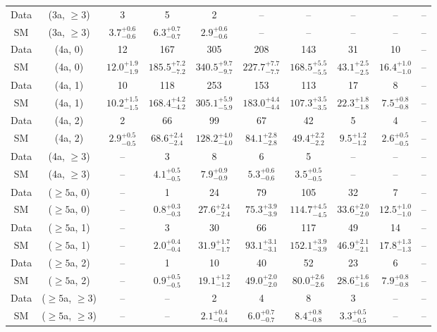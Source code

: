 \begin{table}[h!]
{\begin{tabular}{cccccccccc}
	Data & (3a, $\ge3$) & 3 & 5 & 2 & -- & -- & -- & -- & -- \\[0.5ex] 
	SM & (3a, $\ge3$) & $3.7^{+ 0.6 }_{- 0.6 }$ & $6.3^{+ 0.7 }_{- 0.7 }$ & $2.9^{+ 0.6 }_{- 0.6 }$ & -- & -- & -- & -- & -- \\[0.5ex] 
	Data & (4a, 0) & 12 & 167 & 305 & 208 & 143 & 31 & 10 & -- \\[0.5ex] 
	SM & (4a, 0) & $12.0^{+ 1.9 }_{- 1.9 }$ & $185.5^{+ 7.2 }_{- 7.2 }$ & $340.5^{+ 9.7 }_{- 9.7 }$ & $227.7^{+ 7.7 }_{- 7.7 }$ & $168.5^{+ 5.5 }_{- 5.5 }$ & $43.1^{+ 2.5 }_{- 2.5 }$ & $16.4^{+ 1.0 }_{- 1.0 }$ & -- \\[0.5ex] 
	Data & (4a, 1) & 10 & 118 & 253 & 153 & 113 & 17 & 8 & -- \\[0.5ex] 
	SM & (4a, 1) & $10.2^{+ 1.5 }_{- 1.5 }$ & $168.4^{+ 4.2 }_{- 4.2 }$ & $305.1^{+ 5.9 }_{- 5.9 }$ & $183.0^{+ 4.4 }_{- 4.4 }$ & $107.3^{+ 3.5 }_{- 3.5 }$ & $22.3^{+ 1.8 }_{- 1.8 }$ & $7.5^{+ 0.8 }_{- 0.8 }$ & -- \\[0.5ex] 
	Data & (4a, 2) & 2 & 66 & 99 & 67 & 42 & 5 & 4 & -- \\[0.5ex] 
	SM & (4a, 2) & $2.9^{+ 0.5 }_{- 0.5 }$ & $68.6^{+ 2.4 }_{- 2.4 }$ & $128.2^{+ 4.0 }_{- 4.0 }$ & $84.1^{+ 2.8 }_{- 2.8 }$ & $49.4^{+ 2.2 }_{- 2.2 }$ & $9.5^{+ 1.2 }_{- 1.2 }$ & $2.6^{+ 0.5 }_{- 0.5 }$ & -- \\[0.5ex] 
	Data & (4a, $\ge3$) & -- & 3 & 8 & 6 & 5 & -- & -- & -- \\[0.5ex] 
	SM & (4a, $\ge3$) & -- & $4.1^{+ 0.5 }_{- 0.5 }$ & $7.9^{+ 0.9 }_{- 0.9 }$ & $5.3^{+ 0.6 }_{- 0.6 }$ & $3.5^{+ 0.5 }_{- 0.5 }$ & -- & -- & -- \\[0.5ex] 
	Data & ($\ge5$a, 0) & -- & 1 & 24 & 79 & 105 & 32 & 7 & -- \\[0.5ex] 
	SM & ($\ge5$a, 0) & -- & $0.8^{+ 0.3 }_{- 0.3 }$ & $27.6^{+ 2.4 }_{- 2.4 }$ & $75.3^{+ 3.9 }_{- 3.9 }$ & $114.7^{+ 4.5 }_{- 4.5 }$ & $33.6^{+ 2.0 }_{- 2.0 }$ & $12.5^{+ 1.0 }_{- 1.0 }$ & -- \\[0.5ex] 
	Data & ($\ge5$a, 1) & -- & 3 & 30 & 66 & 117 & 49 & 14 & -- \\[0.5ex] 
	SM & ($\ge5$a, 1) & -- & $2.0^{+ 0.4 }_{- 0.4 }$ & $31.9^{+ 1.7 }_{- 1.7 }$ & $93.1^{+ 3.1 }_{- 3.1 }$ & $152.1^{+ 3.9 }_{- 3.9 }$ & $46.9^{+ 2.1 }_{- 2.1 }$ & $17.8^{+ 1.3 }_{- 1.3 }$ & -- \\[0.5ex] 
	Data & ($\ge5$a, 2) & -- & 1 & 10 & 40 & 52 & 23 & 6 & -- \\[0.5ex] 
	SM & ($\ge5$a, 2) & -- & $0.9^{+ 0.5 }_{- 0.5 }$ & $19.1^{+ 1.2 }_{- 1.2 }$ & $49.0^{+ 2.0 }_{- 2.0 }$ & $80.0^{+ 2.6 }_{- 2.6 }$ & $28.6^{+ 1.6 }_{- 1.6 }$ & $7.9^{+ 0.8 }_{- 0.8 }$ & -- \\[0.5ex] 
	Data & ($\ge5$a, $\ge3$) & -- & -- & 2 & 4 & 8 & 3 & -- & -- \\[0.5ex] 
	SM & ($\ge5$a, $\ge3$) & -- & -- & $2.1^{+ 0.4 }_{- 0.4 }$ & $6.0^{+ 0.7 }_{- 0.7 }$ & $8.4^{+ 0.8 }_{- 0.8 }$ & $3.3^{+ 0.5 }_{- 0.5 }$ & -- & -- \\[0.5ex] 
	\hline
	\hline
\end{tabular}}
\end{table}

